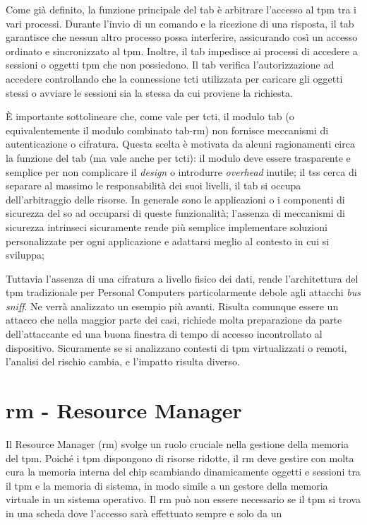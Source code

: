 Come già definito, la funzione principale del \acrshort{tab} è arbitrare l'accesso al \acrshort{tpm} tra i vari processi. Durante l'invio di un comando e la ricezione di una risposta, il \acrshort{tab} garantisce che nessun altro processo possa interferire, assicurando così un accesso ordinato e sincronizzato al \acrshort{tpm}. Inoltre, il \acrshort{tab} impedisce ai processi di accedere a sessioni o oggetti \acrshort{tpm} che non possiedono. Il \acrshort{tab} verifica l'autorizzazione ad accedere controllando che la connessione \acrshort{tcti} utilizzata per caricare gli oggetti stessi o avviare le sessioni sia la stessa da cui proviene la richiesta.

È importante sottolineare che, come vale per \acrshort{tcti}, il modulo \acrshort{tab} (o equivalentemente il modulo combinato \acrshort{tab}-\acrshort{rm}) non fornisce meccanismi di autenticazione o cifratura. Questa scelta è motivata da alcuni ragionamenti circa la funzione del \acrshort{tab} (ma vale anche per \acrshort{tcti}): 
il modulo deve essere trasparente e semplice per non complicare il \textit{design} o introdurre \textit{overhead} inutile; 
il \acrshort{tss} cerca di separare al massimo le responsabilità dei suoi livelli, il \acrshort{tab} si occupa dell'arbitraggio delle risorse. In generale sono le applicazioni o i componenti di sicurezza del \acrshort{so} ad occuparsi di queste funzionalità;
l'assenza di meccanismi di sicurezza intrinseci sicuramente rende più semplice implementare soluzioni personalizzate per ogni applicazione e adattarsi meglio al contesto in cui si sviluppa;

Tuttavia l'assenza di una cifratura a livello fisico dei dati, rende l'architettura del \acrshort{tpm} tradizionale per Personal Computers particolarmente debole agli attacchi \textit{bus sniff}. Ne verrà analizzato un esempio più avanti. Risulta comunque essere un attacco che nella maggior parte dei casi, richiede molta preparazione da parte dell'attaccante ed una buona finestra di tempo di accesso incontrollato al dispositivo. Sicuramente se si analizzano contesti di \acrshort{tpm} virtualizzati o remoti, l'analisi del rischio cambia, e l'impatto risulta diverso.

\section{\acrshort{rm} - Resource Manager}\label{sec:rm}

Il Resource Manager (\acrshort{rm}) svolge un ruolo cruciale nella gestione della memoria del \acrshort{tpm}. Poiché i \acrshort{tpm} dispongono di risorse ridotte, il \acrshort{rm} deve gestire con molta cura la memoria interna del chip scambiando dinamicamente oggetti e sessioni tra il \acrshort{tpm} e la memoria di sistema, in modo simile a un gestore della memoria virtuale in un sistema operativo. Il \acrshort{rm} può non essere necessario se il \acrshort{tpm} si trova in una scheda dove l'accesso sarà effettuato sempre e solo da un 

